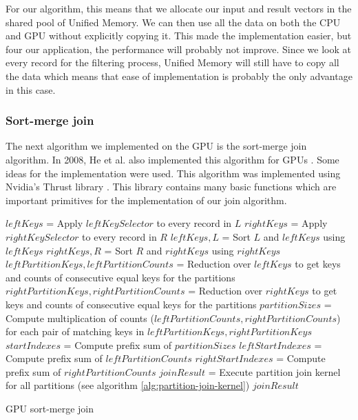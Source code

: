 \documentclass[a4paper,titlepage]{article}
\begin{document}
For our algorithm, this means that we allocate our input and result vectors in the shared pool of Unified Memory. We can then use all the data on both the CPU and GPU without explicitly copying it. This made the implementation easier, but four our application, the performance will probably not improve. Since we look at every record for the filtering process, Unified Memory will still have to copy all the data which means that ease of implementation is probably the only advantage in this case.

\subsubsection{Sort-merge join}
The next algorithm we implemented on the GPU is the sort-merge join algorithm. In 2008, He et al. also implemented this algorithm for GPUs \cite{he2008}. Some ideas for the implementation were used. This algorithm was implemented using Nvidia's Thrust library \cite{thrust}. This library contains many basic functions which are important primitives for the implementation of our join algorithm. 

\begin{algorithm}
 \label{alg:gpu-sort-merge-join}
 
 $leftKeys$ = Apply $leftKeySelector$ to every record in $L$\;
 $rightKeys$ = Apply $rightKeySelector$ to every record in $R$\;
 $leftKeys, L$ = Sort $L$ and $leftKeys$ using $leftKeys$ \;
 $rightKeys, R$ = Sort $R$ and $rightKeys$ using $rightKeys$ \;
 \;
 $leftPartitionKeys, leftPartitionCounts$ = Reduction over $leftKeys$ to get keys and counts of consecutive equal keys for the partitions \;
 $rightPartitionKeys, rightPartitionCounts$ = Reduction over $rightKeys$ to get keys and counts of consecutive equal keys for the partitions \;
 \;
 $partitionSizes$ = Compute multiplication of counts ($leftPartitionCounts, rightPartitionCounts$) for each pair of matching keys in $leftPartitionKeys, rightPartitionKeys$ \;
 \;
 $startIndexes$ = Compute prefix sum of $partitionSizes$ \;
 $leftStartIndexes$ = Compute prefix sum of $leftPartitionCounts$ \;
 $rightStartIndexes$ = Compute prefix sum of $rightPartitionCounts$ \;
 \;
 $joinResult$ = Execute partition join kernel for all partitions (see algorithm \ref{alg:partition-join-kernel})\;
 \Return $joinResult$ \;
 
 \caption{GPU sort-merge join}
\end{algorithm}
\end{document}

